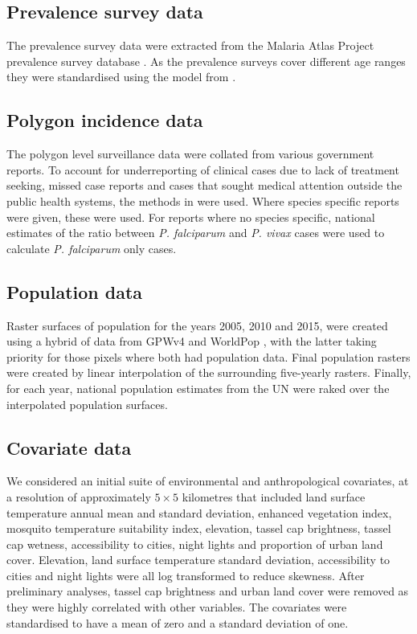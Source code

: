 \documentclass[10pt,letterpaper]{article}
\begin{document}
\subsection*{Prevalence survey data}

The prevalence survey data were extracted from the Malaria Atlas Project prevalence survey database \cite{bhatt2015effect}.
As the prevalence surveys cover different age ranges they were standardised using the model from \cite{smith2007standardizing}.


\subsection*{Polygon incidence data}

The polygon level surveillance data were collated from various government reports.
To account for underreporting of clinical cases due to lack of treatment seeking, missed case reports and cases that sought medical attention outside the public health systems, the methods in \cite{cibulskis2011worldwide} were used.
Where species specific reports were given, these were used. 
For reports where no species specific, national estimates of the ratio between \emph{P. falciparum} and \emph{P. vivax} cases were used to calculate \emph{P. falciparum} only cases.



\subsection*{Population data}

Raster surfaces of population for the years 2005, 2010 and 2015, were created using a hybrid of data from GPWv4 \cite{gpw4} and WorldPop \cite{tatem2017worldpop}, with the latter taking priority for those pixels where both had population data. 
Final population rasters were created by linear interpolation of the surrounding five-yearly rasters.
Finally, for each year, national population estimates from the UN were raked over the interpolated population surfaces. 

\subsection*{Covariate data}

We considered an initial suite of environmental and anthropological covariates, at a resolution of approximately $5 \times 5$ kilometres that included land surface temperature annual mean and standard deviation, enhanced vegetation index, mosquito temperature suitability index, elevation, tassel cap brightness, tassel cap wetness, accessibility to cities, night lights and proportion of urban land cover.
Elevation, land surface temperature standard deviation, accessibility to cities and night lights were all log transformed to reduce skewness.
After preliminary analyses, tassel cap brightness and urban land cover were removed as they were highly correlated with other variables.
The covariates were standardised to have a mean of zero and a standard deviation of one.
\end{document}
